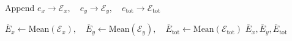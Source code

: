 \begin{algorithm}[t]
\begin{algorithmic}[1]
        \State Append $e_x \to \mathcal{E}_x, \quad e_y \to \mathcal{E}_y, \quad e_{\text{tot}} \to \mathcal{E}_{\text{tot}}$
    \EndFor

    \State $\bar{E}_x \gets \text{Mean}(\mathcal{E}_x), \quad \bar{E}_y \gets \text{Mean}(\mathcal{E}_y), \quad \bar{E}_{\text{tot}} \gets \text{Mean}(\mathcal{E}_{\text{tot}})$
    \State \Return $\bar{E}_x, \bar{E}_y, \bar{E}_{\text{tot}}$ 
\EndFunction

\end{algorithmic}
\end{algorithm}